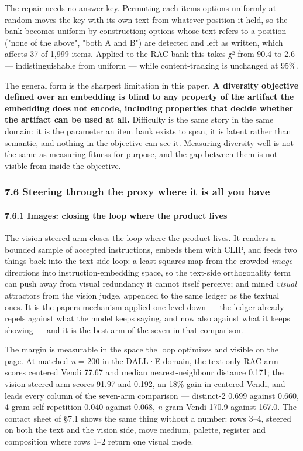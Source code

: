 \documentclass[
  10pt,
]{article}
\theoremstyle{plain}
\theoremstyle{definition}
\begin{document}
The repair needs no answer key. Permuting each item\textquotesingle s
options uniformly at random moves the key with its own text from
whatever position it held, so the bank becomes uniform by construction;
options whose text refers to a position ("none of the above", "both A
and B") are detected and left as written, which affects 37 of 1,999
items. Applied to the RAC bank this takes χ² from 90.4 to 2.6 ---
indistinguishable from uniform --- while content-tracking is unchanged
at 95\%.

The general form is the sharpest limitation in this paper. \textbf{A
diversity objective defined over an embedding is blind to any property
of the artifact the embedding does not encode, including properties that
decide whether the artifact can be used at all.} Difficulty is the same
story in the same domain: it is the parameter an item bank exists to
span, it is latent rather than semantic, and nothing in the objective
can see it. Measuring diversity well is not the same as measuring
fitness for purpose, and the gap between them is not visible from inside
the objective.

\subsubsection{7.6 Steering through the proxy where it is all you
have}\label{76-steering-through-the-proxy-where-it-is-all-you-have}

\paragraph{7.6.1 Images: closing the loop where the product
lives}\label{761-images-closing-the-loop-where-the-product-lives}

The vision-steered arm closes the loop where the product lives. It
renders a bounded sample of accepted instructions, embeds them with
CLIP, and feeds two things back into the text-side loop: a least-squares
map from the crowded \emph{image} directions into instruction-embedding
space, so the text-side orthogonality term can push away from visual
redundancy it cannot itself perceive; and mined \emph{visual} attractors
from the vision judge, appended to the same ledger as the textual ones.
It is the paper\textquotesingle s mechanism applied one level down ---
the ledger already repels against what the model keeps saying, and now
also against what it keeps showing --- and it is the best arm of the
seven in that comparison.

The margin is measurable in the space the loop optimizes and visible on
the page. At matched \emph{n} = 200 in the DALL·E domain, the text-only
RAC arm scores centered Vendi 77.67 and median nearest-neighbour
distance 0.171; the vision-steered arm scores 91.97 and 0.192, an 18\%
gain in centered Vendi, and leads every column of the seven-arm
comparison --- distinct-2 0.699 against 0.660, 4-gram self-repetition
0.040 against 0.068, \emph{n}-gram Vendi 170.9 against 167.0. The
contact sheet of §7.1 shows the same thing without a number: rows 3--4,
steered on both the text and the vision side, move medium, palette,
register and composition where rows 1--2 return one visual mode.
\end{document}
